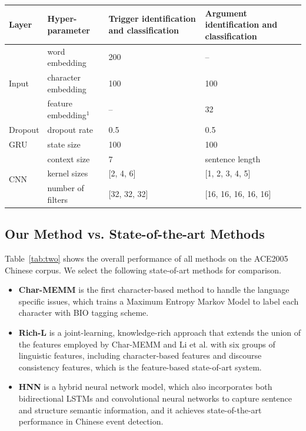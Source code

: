 \begin{table}
  {\begin{threeparttable}
\begin{tabular}{|l|l|p{}|p{}|} \hline
	Layer & Hyper-parameter & Trigger identification and classification & Argument identification and classification \\ \hline
	\multirow{3}{*}{Input} & word embedding & 200 & -- \\ & character embedding & 100 & 100 \\ & feature embedding{$^1$} & -- & 32 \\  \hline
	Dropout & dropout rate & 0.5 & 0.5 \\ \hline
	GRU & state size & 100 & 100 \\ \hline
	\multirow{3}{*}{CNN} & context size & 7 & sentence length \\ & kernel sizes & [2, 4, 6] & [1, 2, 3, 4, 5] \\ & number of filters & [32, 32, 32] & [16, 16, 16, 16, 16] \\ \hline
\end{tabular}
\begin{tabnote}%
\end{tabnote}%
\end{threeparttable}}
\end{table}

\subsection{Our Method vs. State-of-the-art Methods}
Table~\ref{tab:two} shows the overall performance of all methods on the ACE2005 Chinese corpus. We select the following state-of-art methods for comparison.

\begin{itemize}
	\item \textbf{Char-MEMM} \cite{chen2009language} is the first character-based method to handle the language specific issues, which trains a Maximum Entropy Markov Model to label each character with BIO tagging scheme.
	\item \textbf{Rich-L} \cite{chen2012joint} is a joint-learning, knowledge-rich approach that extends the union of the features employed by Char-MEMM and Li et al.  with six groups of linguistic features, including character-based features and discourse consistency features, which is the feature-based state-of-art system.
	\item \textbf{HNN} \cite{feng2016language} is a hybrid neural network model, which also incorporates both bidirectional LSTMs and convolutional neural networks to capture sentence and structure semantic information, and it achieves state-of-the-art performance in Chinese event detection.
\end{itemize}

